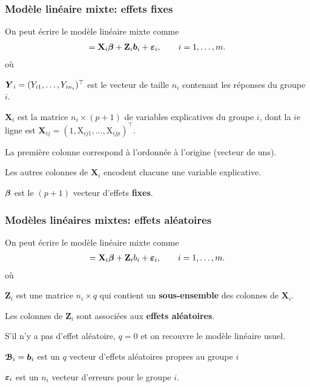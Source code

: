 \documentclass{beamer}
\begin{document}
\begin{frame}\frametitle{Modèle linéaire mixte: effets fixes}


On peut écrire le modèle linéaire mixte comme
\begin{align*}
[\bs{Y}_i \mid \bs{\mathcal{B}}_i=\bs{b}_i]= \mathbf{X}_i \bs{\beta} + \mathbf{Z}_i \bs{b}_i + \bs{\eps}_i, \qquad i = 1, \ldots, m.
\end{align*} 
où
\bi
\item $\boldsymbol {Y}_i=(Y_{i1},\ldots,Y_{in_i})^{\top}$ est le vecteur de taille $n_i$ contenant les réponses du groupe $i$.

\item $\mathbf{X}_i$ est la matrice $n_i \times (p+1)$ de variables explicatives du groupe $i$, dont la $i$e ligne est $\mathbf{X}_{ij}=(1,\mathrm{X}_{ij1},\ldots,\mathrm{X}_{ijp})^{\top}$. 
\bi 
\item La première colonne correspond à l'ordonnée à l'origine (vecteur de uns).
\item Les autres colonnes de $\mathbf{X}_i$ encodent chacune une variable explicative.
\ei
\item $\boldsymbol {\beta}$ est le $(p+1)$ vecteur d'effets \textbf{fixes}.
\ei
\end{frame}

\begin{frame}\frametitle{Modèles linéaires mixtes: effets aléatoires}
On peut écrire le modèle linéaire mixte comme
\begin{align*}
[\bs{Y}_i \mid \bs{\mathcal{B}}_i=\bs{b}_i]= \mathbf{X}_i \bs{\beta} + \mathbf{Z}_i b_i + \bs{\eps}_i, \qquad i = 1, \ldots, m.
\end{align*} 
où
\bi
\item $\mathbf{Z}_i$ est une matrice $n_i \times q$ qui contient un \textbf{sous-ensemble} des colonnes de $\mathbf{X}_i$. 
\bi \item Les colonnes de $\mathbf{Z}_i$ sont associées aux \textbf{effets aléatoires}. 
\item S'il n'y a pas d'effet aléatoire, $q=0$ et on recouvre le modèle linéaire usuel.
\ei
\item  $\boldsymbol {\mathcal{B}}_i=\boldsymbol {b}_i$ est un $q$ vecteur d'effets aléatoires propres au groupe $i$
\item $\boldsymbol {\varepsilon}_i$ est un $n_i$ vecteur d'erreurs pour le groupe $i$.
\ei

\end{frame}
\end{document}
